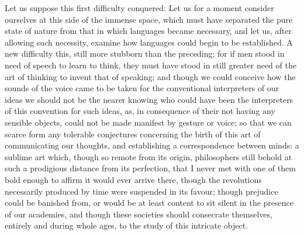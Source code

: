 \documentclass[11pt,twocolumn]{ltugboat}
\begin{document}
Let us suppose this first difficulty conquered: Let us for a moment
consider ourselves at this side of the immense space, which must have
separated the pure state of nature from that in which languages became
necessary, and let us, after allowing such necessity, examine how
languages could begin to be established. A new difficulty this, still
more stubborn than the preceding; for if men stood in need of speech
to learn to think, they must have stood in still greater need of the
art of thinking to invent that of speaking; and though we could
conceive how the sounds of the voice came to be taken for the
conventional interpreters of our ideas we should not be the nearer
knowing who could have been the interpreters of this convention for
such ideas, as, in consequence of their not having any sensible
objects, could not be made manifest by gesture or voice; so that we
can scarce form any tolerable conjectures concerning the birth of this
art of communicating our thoughts, and establishing a correspondence
between minds: a sublime art which, though so remote from its origin,
philosophers still behold at such a prodigious distance from its
perfection, that I never met with one of them bold enough to affirm it
would ever arrive there, though the revolutions necessarily produced
by time were suspended in its favour; though prejudice could be
banished from, or would be at least content to sit silent in the
presence of our academies, and though these societies should
consecrate themselves, entirely and during whole ages, to the study of
this intricate object.
\end{document}
